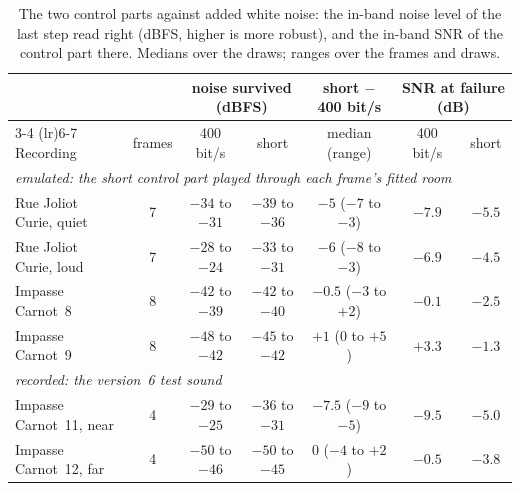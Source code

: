 \documentclass[11pt,a4paper]{article}
\theoremstyle{remark}
\begin{document}
\begin{table}[ht]
\centering
\caption{The two control parts against added white noise: the in-band noise level of the last step read right (dBFS, higher is more robust), and the in-band SNR of the control part there. Medians over the draws; ranges over the frames and draws.}
\label{tab:c6res}
\small
\setlength{\tabcolsep}{4.5pt}
\begin{tabular}{lcccccc}
\toprule
& & \multicolumn{2}{c}{noise survived (dBFS)} & short $-$ 400 bit/s & \multicolumn{2}{c}{SNR at failure (dB)}\\
\cmidrule(lr){3-4} \cmidrule(lr){6-7}
Recording & frames & 400 bit/s & short & median (range) & 400 bit/s & short\\
\midrule
\multicolumn{7}{l}{\emph{emulated: the short control part played through each frame's fitted room}}\\
Rue Joliot Curie, quiet & 7 & $-34$ to $-31$ & $-39$ to $-36$ & $-5$ ($-7$ to $-3$) & $-7.9$ & $-5.5$\\
Rue Joliot Curie, loud & 7 & $-28$ to $-24$ & $-33$ to $-31$ & $-6$ ($-8$ to $-3$) & $-6.9$ & $-4.5$\\
Impasse Carnot~8 & 8 & $-42$ to $-39$ & $-42$ to $-40$ & $-0.5$ ($-3$ to $+2$) & $-0.1$ & $-2.5$\\
Impasse Carnot~9 & 8 & $-48$ to $-42$ & $-45$ to $-42$ & $+1$ ($0$ to $+5$) & $+3.3$ & $-1.3$\\
\midrule
\multicolumn{7}{l}{\emph{recorded: the version~6 test sound}}\\
Impasse Carnot~11, near & 4 & $-29$ to $-25$ & $-36$ to $-31$ & $-7.5$ ($-9$ to $-5$) & $-9.5$ & $-5.0$\\
Impasse Carnot~12, far & 4 & $-50$ to $-46$ & $-50$ to $-45$ & $0$ ($-4$ to $+2$) & $-0.5$ & $-3.8$\\
\bottomrule
\end{tabular}
\end{table}
\end{document}
